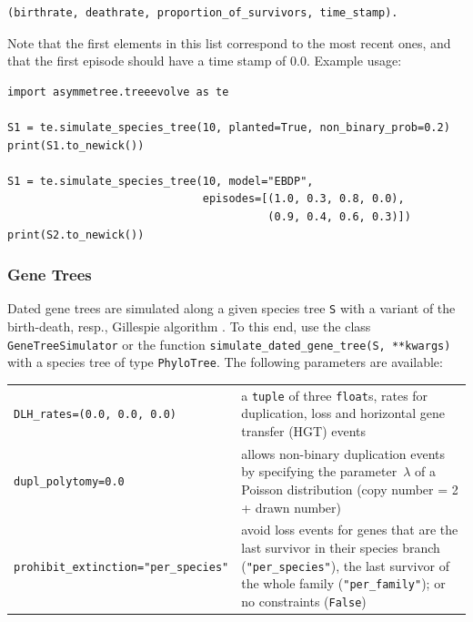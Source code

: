 \documentclass[hidelinks,11pt]{article}
\begin{document}
\begin{adjustwidth}{1cm}{1cm}\vspace{2mm}
\begin{verbatim}
(birthrate, deathrate, proportion_of_survivors, time_stamp).
\end{verbatim}
\end{adjustwidth}

\noindent
Note that the first elements in this list correspond to the most recent ones, and that the first episode should have a time stamp of 0.0.
Example usage:

\begin{adjustwidth}{1cm}{1cm}\vspace{2mm}
\begin{verbatim}
import asymmetree.treeevolve as te

S1 = te.simulate_species_tree(10, planted=True, non_binary_prob=0.2)
print(S1.to_newick())

S1 = te.simulate_species_tree(10, model="EBDP",
                              episodes=[(1.0, 0.3, 0.8, 0.0),
                                        (0.9, 0.4, 0.6, 0.3)])
print(S2.to_newick())
\end{verbatim}
\end{adjustwidth}


\subsubsection{Gene Trees}

Dated gene trees are simulated along a given species tree \texttt{S} with a variant of the birth-death, resp., Gillespie algorithm \citep{kendall1948,gillespie1976}.
To this end, use the class \texttt{GeneTreeSimulator} or the function \texttt{simulate\_dated\_gene\_tree(S, **kwargs)} with a species tree of type \texttt{PhyloTree}.
The following parameters are available:

\vspace{3mm}
{\small\centering
\begin{longtable}{ p{4.0cm} p{9cm} }
	\texttt{DLH\_rates=\newline (0.0, 0.0, 0.0)} & a \texttt{tuple} of three \texttt{float}s, rates for duplication, loss and horizontal gene transfer (HGT) events\\
	\texttt{dupl\_polytomy=0.0}  & allows non-binary duplication events by specifying
	the parameter~$\lambda$ of a Poisson distribution (copy number = 2 + drawn number)\\
	\texttt{prohibit\_extinction=\newline "per\_species"}  & avoid loss events for genes that are the last survivor in their species branch (\texttt{"per\_species"}), the last survivor of the whole family (\texttt{"per\_family"}); or no constraints  (\texttt{False})
\end{longtable}
}
\vspace{3mm}
\end{document}
